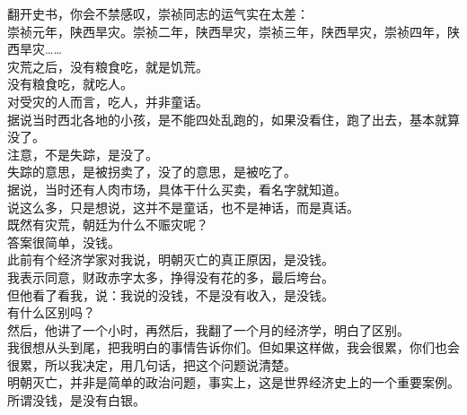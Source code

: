 \begin{multicols}{\theparacolNo}
翻开史书，你会不禁感叹，崇祯同志的运气实在太差：\\

崇祯元年，陕西旱灾。崇祯二年，陕西旱灾，崇祯三年，陕西旱灾，崇祯四年，陕西旱灾……\\

灾荒之后，没有粮食吃，就是饥荒。\\

没有粮食吃，就吃人。\\

对受灾的人而言，吃人，并非童话。\\

据说当时西北各地的小孩，是不能四处乱跑的，如果没看住，跑了出去，基本就算没了。\\

注意，不是失踪，是没了。\\

失踪的意思，是被拐卖了，没了的意思，是被吃了。\\

据说，当时还有人肉市场，具体干什么买卖，看名字就知道。\\

说这么多，只是想说，这并不是童话，也不是神话，而是真话。\\

既然有灾荒，朝廷为什么不赈灾呢？\\

答案很简单，没钱。\\

此前有个经济学家对我说，明朝灭亡的真正原因，是没钱。\\

我表示同意，财政赤字太多，挣得没有花的多，最后垮台。\\

但他看了看我，说：我说的没钱，不是没有收入，是没钱。\\

有什么区别吗？\\

然后，他讲了一个小时，再然后，我翻了一个月的经济学，明白了区别。\\

我很想从头到尾，把我明白的事情告诉你们。但如果这样做，我会很累，你们也会很累，所以我决定，用几句话，把这个问题说清楚。\\

明朝灭亡，并非是简单的政治问题，事实上，这是世界经济史上的一个重要案例。\\

所谓没钱，是没有白银。\\


\end{multicols}
